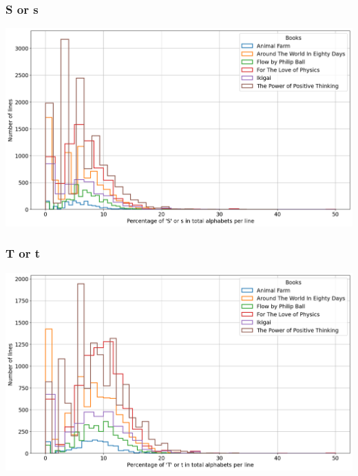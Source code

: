 \begin{frame}
    \frametitle{S or s}
    \begin{center}
        \hspace*{-5ex}
        \includegraphics[scale=0.35]{../01_programFiles/histograms/s.png}\hspace{10ex}
    \end{center}
\end{frame}

\begin{frame}
    \frametitle{T or t}
    \begin{center}
        \hspace*{-5ex}
        \includegraphics[scale=0.35]{../01_programFiles/histograms/t.png}\hspace{10ex}
    \end{center}
\end{frame}

